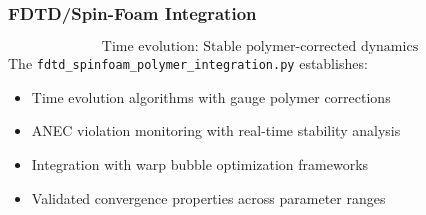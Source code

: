 \documentclass[11pt]{article}
\begin{document}
\subsubsection*{FDTD/Spin-Foam Integration}
\[
  \boxed{\text{Time evolution: Stable polymer-corrected dynamics}}
\]
The \texttt{fdtd\_spinfoam\_polymer\_integration.py} establishes:
\begin{itemize}
  \item Time evolution algorithms with gauge polymer corrections
  \item ANEC violation monitoring with real-time stability analysis
  \item Integration with warp bubble optimization frameworks
  \item Validated convergence properties across parameter ranges
\end{itemize}
\end{document}
